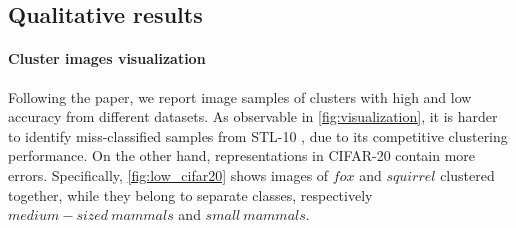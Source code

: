 \documentclass{article}
\begin{document}
\subsection{Qualitative results}
\paragraph{Cluster images visualization} 
Following the paper, we report image samples of clusters with high and low accuracy from different datasets.
As observable in \autoref{fig:visualization}, it is harder to identify miss-classified samples from STL-10 \cite{stl_10}, due to its competitive clustering performance. On the other hand, representations in CIFAR-20 contain more errors. Specifically, \autoref{fig:low_cifar20} shows images of $fox$ and $squirrel$ clustered together, while they belong to separate classes, respectively $medium-sized\ mammals$ and $small\ mammals$.
\end{document}
